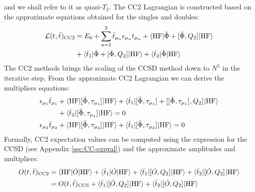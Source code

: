 and we shall refer to it as quasi-$T_2$.
The \acrshort*{CC2} Lagrangian is constructed based on the approximate
equations obtained for the singles and
doubles:\autocite{Christiansen1995-vy, Helgaker2000-tz}
\begin{equation}\label{eq:cc2-lagrangian}
  \begin{aligned}
  \mathcal{L}(t_{}, \bar{t}_{})_\mathrm{CC2}
  &=
  E_0
  + \sum_{u=1}^{2}\bar{t}_{\mu_u}\epsilon_{\mu_u}t_{\mu_u}
  + \braket{\mathrm{HF} | \check{\Phi} + [ \check{\Phi}, Q_2 ]^{} | \mathrm{HF}} \\
  &+ \braket{\bar{t}_{1} |
  \check{\Phi} + [ \check{\Phi}, Q_2 ]^{}
  | \mathrm{HF}}
  + \braket{\bar{t}_{2} | \check{\Phi} | \mathrm{HF}}
  \end{aligned}
\end{equation}
The \acrshort*{CC2} methods brings the scaling of the \acrshort*{CCSD}
method down to $N^5$ in the iterative step.
From the approximate \acrshort*{CC2} Lagrangian we can derive the
multipliers equations:
\begin{subequations}\label{eq:cc2-multipliers}
  \begin{align}
    \epsilon_{\mu_1}\bar{t}_{\mu_1} &+
     \braket{\mathrm{HF} | [ \check{\Phi}, \tau_{\mu_1} ]^{} | \mathrm{HF}}
   + \braket{\bar{t}_{1} |
       [ \check{\Phi}, \tau_{\mu_1} ]^{}
     + [ [ \check{\Phi}, \tau_{\mu_1} ]^{}, Q_2 ]^{}
     | \mathrm{HF}} \nonumber \\
   &+ \braket{\bar{t}_{2} | [ \check{\Phi}, \tau_{\mu_1} ]^{} |
   \mathrm{HF}} = 0 \label{eq:cc2-singles-multipliers} \\
    \epsilon_{\mu_2}\bar{t}_{\mu_2} &+
    \braket{\mathrm{HF} | [ \check{\Phi}, \tau_{\mu_2} ]^{} | \mathrm{HF}}
   + \braket{\bar{t}_{1} |
       [ \check{\Phi}, \tau_{\mu_2} ]^{}
     | \mathrm{HF}}
     = 0 \label{eq:cc2-doubles-multipliers}
  \end{align}
\end{subequations}
Formally, \acrshort*{CC2} expectation values can be computed using the
expression for the \acrshort*{CCSD} (see Appendix \ref{sec:CC-expval})
and the approximate amplitudes and multipliers:
\begin{equation}\label{eq:cc2-expectation-value}
  \begin{aligned}
  O(t_{}, \bar{t}_{})_\mathrm{CC2}
  &=
  \braket{\mathrm{HF} | \check{O} | \mathrm{HF} }
  + \braket{\bar{t}_{1} | \check{O} | \mathrm{HF} }
  + \braket{\bar{t}_{1} | [ \check{O}, Q_2 ]^{} | \mathrm{HF} }
  + \braket{\bar{t}_{2} | [ \check{O}, Q_2 ]^{} | \mathrm{HF} } \\
  &=
  O(t_{}, \bar{t}_{})_\mathrm{CCS}
  + \braket{\bar{t}_{1} | [ \check{O}, Q_2 ]^{} | \mathrm{HF} }
  + \braket{\bar{t}_{2} | [ \check{O}, Q_2 ]^{} | \mathrm{HF} }
  \end{aligned}
\end{equation}

